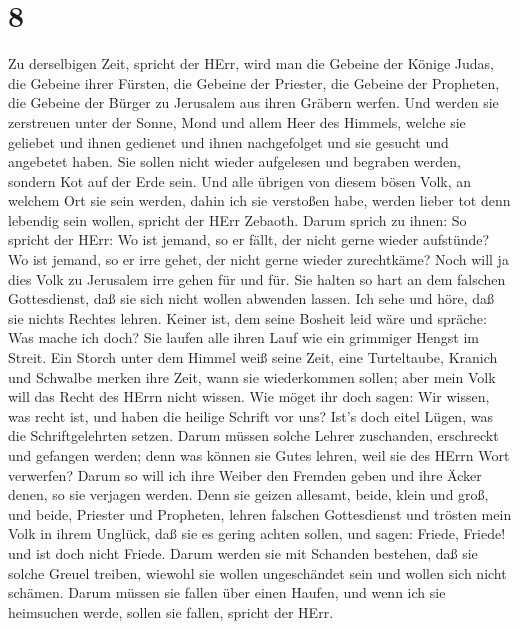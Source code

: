 \hypertarget{section-7}{%
\section{8}\label{section-7}}

 Zu derselbigen Zeit, spricht der HErr, wird man die Gebeine
der Könige Judas, die Gebeine ihrer Fürsten, die Gebeine der Priester,
die Gebeine der Propheten, die Gebeine der Bürger zu Jerusalem aus ihren
Gräbern werfen.  Und werden sie zerstreuen unter der Sonne,
Mond und allem Heer des Himmels, welche sie geliebet und ihnen gedienet
und ihnen nachgefolget und sie gesucht und angebetet haben. Sie sollen
nicht wieder aufgelesen und begraben werden, sondern Kot auf der Erde
sein.  Und alle übrigen von diesem bösen Volk, an welchem
Ort sie sein werden, dahin ich sie verstoßen habe, werden lieber tot
denn lebendig sein wollen, spricht der HErr Zebaoth.  Darum
sprich zu ihnen: So spricht der HErr: Wo ist jemand, so er fällt, der
nicht gerne wieder aufstünde? Wo ist jemand, so er irre gehet, der nicht
gerne wieder zurechtkäme?  Noch will ja dies Volk zu
Jerusalem irre gehen für und für. Sie halten so hart an dem falschen
Gottesdienst, daß sie sich nicht wollen abwenden lassen. 
Ich sehe und höre, daß sie nichts Rechtes lehren. Keiner ist, dem seine
Bosheit leid wäre und spräche: Was mache ich doch? Sie laufen alle ihren
Lauf wie ein grimmiger Hengst im Streit.  Ein Storch unter
dem Himmel weiß seine Zeit, eine Turteltaube, Kranich und Schwalbe
merken ihre Zeit, wann sie wiederkommen sollen; aber mein Volk will das
Recht des HErrn nicht wissen.  Wie möget ihr doch sagen: Wir
wissen, was recht ist, und haben die heilige Schrift vor uns? Ist's doch
eitel Lügen, was die Schriftgelehrten setzen.  Darum müssen
solche Lehrer zuschanden, erschreckt und gefangen werden; denn was
können sie Gutes lehren, weil sie des HErrn Wort verwerfen?
 Darum so will ich ihre Weiber den Fremden geben und ihre
Äcker denen, so sie verjagen werden. Denn sie geizen allesamt, beide,
klein und groß, und beide, Priester und Propheten, lehren falschen
Gottesdienst  und trösten mein Volk in ihrem Unglück, daß
sie es gering achten sollen, und sagen: Friede, Friede! und ist doch
nicht Friede.  Darum werden sie mit Schanden bestehen, daß
sie solche Greuel treiben, wiewohl sie wollen ungeschändet sein und
wollen sich nicht schämen. Darum müssen sie fallen über einen Haufen,
und wenn ich sie heimsuchen werde, sollen sie fallen, spricht der HErr.
